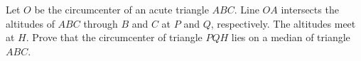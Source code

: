 Let $O$ be the circumcenter of an acute triangle $ABC$.
Line $OA$ intersects the altitudes of $ABC$ through $B$ and $C$ at $P$ and $Q$, respectively.
The altitudes meet at $H$.
Prove that the circumcenter of triangle $PQH$ lies on a median of triangle $ABC$.
